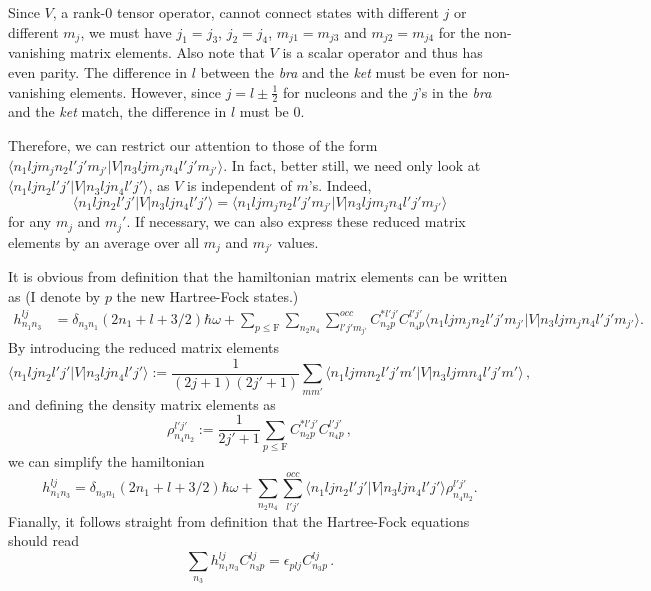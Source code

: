 \documentclass[11pt, oneside]{article}   	%
\begin{document}
Since $V$, a rank-0 tensor operator, cannot connect states with different $j$ or different $m_j$, we must have $j_1 = j_3$, $j_2 = j_4$, $m_{j1} = m_{j3}$ and $m_{j2} = m_{j4}$ for the non-vanishing matrix elements. Also note that $V$ is a scalar operator and thus has even parity. The difference in $l$ between the \textit{bra} and the \textit{ket} must be even for non-vanishing elements. However, since $j = l \pm \frac{1}{2}$ for nucleons and the $j$'s in the \textit{bra} and the \textit{ket} match, the difference in $l$ must be 0. 

Therefore, we can restrict our attention to those of the form $\langle n_1ljm_jn_2l'j'm_{j'}|V|n_3ljm_jn_4l'j'm_{j'}\rangle$. In fact, better still, we need only look at $\langle n_1ljn_2l'j'|V|n_3ljn_4l'j'\rangle$, as $V$ is independent of $m$'s. Indeed, 
\begin{equation*}
\label{ }
\langle n_1ljn_2l'j'|V|n_3ljn_4l'j'\rangle = \langle n_1ljm_jn_2l'j'm_{j'}|V|n_3ljm_jn_4l'j'm_{j'}\rangle
\end{equation*} for any $m_j$ and $m_j'$. If necessary, we can also express these reduced matrix elements by an average over all $m_j$ and $m_{j'}$ values. 

It is obvious from definition that the hamiltonian matrix elements can be written as (I denote by $p$ the new Hartree-Fock states.)
\begin{align*}
\label{ }
h^{lj}_{n_1n_3} &= \delta_{n_3 n_1}(2n_1+l + 3/2)\hbar\omega + \sum_{p \leq \mathrm{F}}\sum_{n_2n_4}\sum_{l'j'm_{j'}}^{occ} C^{*l'j'}_{n_2 p} C^{l'j'}_{n_4 p} \langle n_1ljm_jn_2l'j'm_{j'}|V|n_3ljm_jn_4l'j'm_{j'}\rangle.
\end{align*}
By introducing the reduced matrix elements
\begin{equation*}
\label{ }
\langle n_1ljn_2l'j'|V|n_3ljn_4l'j'\rangle := \frac{1}{(2j+1)(2j'+1)}\sum_{mm'}  \langle n_1ljmn_2l'j'm'|V|n_3ljmn_4l'j'm'\rangle\, ,
\end{equation*}
and defining the density matrix elements as
\begin{equation*}
\label{ }
\rho^{l'j'}_{n_4n_2} := \frac{1}{2j'+1} \sum_{p  \leq \mathrm{F}} C^{*l'j'}_{n_2p}C^{l'j'}_{n_4p}\,,
\end{equation*}
we can simplify the hamiltonian
\begin{equation*}
\label{ }
h^{lj}_{n_1n_3} = \delta_{n_3 n_1}(2n_1+l + 3/2)\hbar\omega + \sum_{n_2n_4}\sum_{l'j'}^{occ}\langle n_1ljn_2l'j'|V|n_3ljn_4l'j'\rangle\rho^{l'j'}_{n_4n_2}.
\end{equation*}
Fianally, it follows straight from definition that the Hartree-Fock equations should read
\begin{equation*}
\label{ }
\sum_{n_3} h^{lj}_{n_1n_3}C^{lj}_{n_3p} = \epsilon_{plj}C^{lj}_{n_3p}\,.
\end{equation*}
\end{document}
